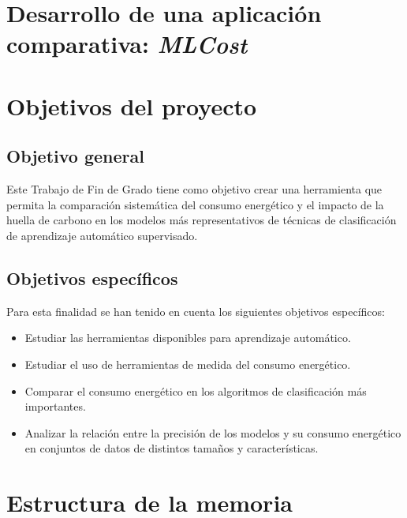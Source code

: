 \section{Desarrollo de una aplicación comparativa: \emph{MLCost}}




\section{Objetivos del proyecto}
\label{sec:objetivos}

\subsection{Objetivo general} %
\label{sec:objetivo-general} %


Este Trabajo de Fin de Grado tiene como objetivo crear una herramienta que permita la comparación sistemática del consumo energético y el impacto de la huella de carbono en los modelos más representativos de técnicas de clasificación de aprendizaje automático supervisado.


\subsection{Objetivos específicos}
\label{sec:objetivos-especificos}

Para esta finalidad se han tenido en cuenta los siguientes objetivos específicos:

    \begin{itemize}
        \item Estudiar las herramientas disponibles para aprendizaje automático.
        \item Estudiar el uso de herramientas de medida del consumo energético.
        \item Comparar el consumo energético en los algoritmos de clasificación más importantes.
        \item Analizar la relación entre la precisión de los modelos y su consumo energético en conjuntos de datos de distintos tamaños y características.
    \end{itemize}



\section{Estructura de la memoria}
\label{sec:estructura}



